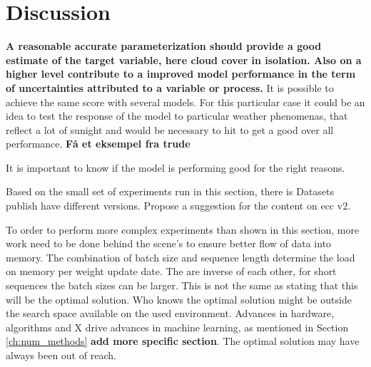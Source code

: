 \chapter{Discussion}


\textbf{A reasonable accurate parameterization should provide a good estimate of the target variable, here cloud cover in isolation. Also on a higher level contribute to a improved model performance in the term of uncertainties attributed to a variable or process.}  It is possible to achieve the same score with several  models. For this particular case it could be an idea to test the response of the model to particular weather phenomenas, that reflect a lot of sunight and would be necessary to hit to get a good over all performance. \textbf{Få et eksempel fra trude} 

It is important to know if the model is performing good for the right reasons.

Based on the small set of experiments run in this section, there is 
Datasets publish have different versions. Propose a suggestion for the content on \acrshort{ecc} v2.

To order to perform more complex experiments than shown in this section, more work need to be done behind the scene's to ensure better flow of data into memory. The combination of batch size and sequence length determine the load on memory per weight update date. The are inverse of each other, for short sequences the batch sizes can be larger. This is not the same as stating that this will be the optimal solution. Who knows the optimal solution might be outside the search space available on the used environment. Advances in hardware, algorithms and X drive advances in machine learning, as mentioned in Section \ref{ch:num_methods} \textbf{add more specific section}. The optimal solution may have always been out of reach. 